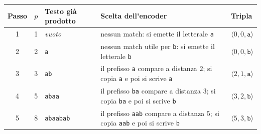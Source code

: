 \documentclass{article}
\theoremstyle{definition}
\numberwithin{equation}{section}
\begin{document}
\begin{center}
    \small
    \renewcommand{\arraystretch}{1.25}
    \begin{tabular}{|c|c|p{}|p{}|p{}|}
        \hline
        \textbf{Passo}                                                                                    & \textbf{$p$} & \textbf{Testo già prodotto} & \textbf{Scelta dell'encoder} & \textbf{Tripla} \\ \hline
        1                                                                                                 & 1            & \emph{vuoto}                &
        nessun match: si emette il letterale \texttt{a}                                                   &
        $\langle 0,0,\texttt{a}\rangle$                                                                                                                                                                 \\ \hline
        2                                                                                                 & 2            & \texttt{a}                  &
        nessun match utile per \texttt{b}: si emette il letterale \texttt{b}                              &
        $\langle 0,0,\texttt{b}\rangle$                                                                                                                                                                 \\ \hline
        3                                                                                                 & 3            & \texttt{ab}                 &
        il prefisso \texttt{a} compare a distanza $2$; si copia \texttt{a} e poi si scrive \texttt{a}     &
        $\langle 2,1,\texttt{a}\rangle$                                                                                                                                                                 \\ \hline
        4                                                                                                 & 5            & \texttt{abaa}               &
        il prefisso \texttt{ba} compare a distanza $3$; si copia \texttt{ba} e poi si scrive \texttt{b}   &
        $\langle 3,2,\texttt{b}\rangle$                                                                                                                                                                 \\ \hline
        5                                                                                                 & 8            & \texttt{abaabab}            &
        il prefisso \texttt{aab} compare a distanza $5$; si copia \texttt{aab} e poi si scrive \texttt{b} &
        $\langle 5,3,\texttt{b}\rangle$                                                                                                                                                                 \\ \hline
    \end{tabular}
\end{center}
\end{document}

